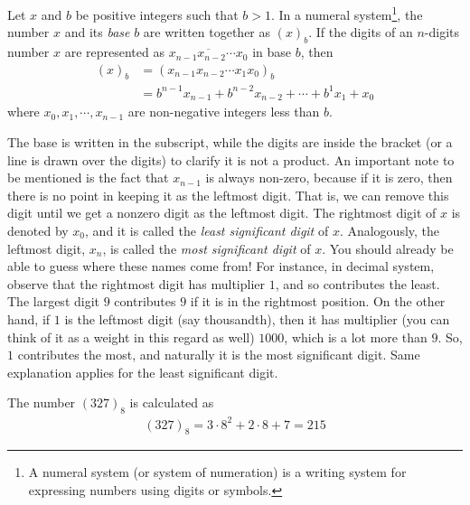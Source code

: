 \begin{definition}\label{def:base}
	Let $x$ and $b$ be positive integers such that $b>1$. In a numeral system\footnote{A numeral system (or system of numeration) is a writing system for expressing numbers using digits or symbols.}, the number $x$ and its \textit{base} $b$ are written together as $(x)_b$. If the digits of an $n$-digits number $x$ are represented as $\overline{x_{n-1}x_{n-2}\cdots x_0}$ in base $b$, then
	\begin{align*}
		(x)_b
			& = (x_{n-1}x_{n-2}\cdots x_1x_0)_b\\
			& =b^{n-1} x_{n-1} + b^{n-2} x_{n-2} + \cdots + b^1x_1 + x_0
	\end{align*}
	where $x_0, x_1, \cdots, x_{n-1}$ are non-negative integers less than $b$.
\end{definition}

The base is written in the subscript, while the digits are inside the bracket (or a line is drawn over the digits) to clarify it is not a product. An important note to be mentioned is the fact that $x_{n-1}$ is always non-zero, because if it is zero, then there is no point in keeping it as the leftmost digit. That is, we can remove this digit until we get a nonzero digit as the leftmost digit. The rightmost digit of $x$ is denoted by $x_0$, and it is called the \textit{least significant digit} of $x$. Analogously, the leftmost digit, $x_n$, is called the \textit{most significant digit} of $x$. You should already be able to guess where these names come from! For instance, in decimal system, observe that the rightmost digit has multiplier $1$, and so contributes the least. The largest digit $9$ contributes $9$ if it is in the rightmost position. On the other hand, if $1$ is the leftmost digit (say thousandth), then it has multiplier (you can think of it as a weight in this regard as well) $1000$, which is a lot more than $9$. So, $1$ contributes the most, and naturally it is the most significant digit. Same explanation applies for the least significant digit.
\begin{example}
	The number $(327)_8$ is calculated as
	\begin{align*}
		(327)_8 = 3 \cdot 8^2 + 2 \cdot 8 + 7 = 215
	\end{align*}
\end{example}

